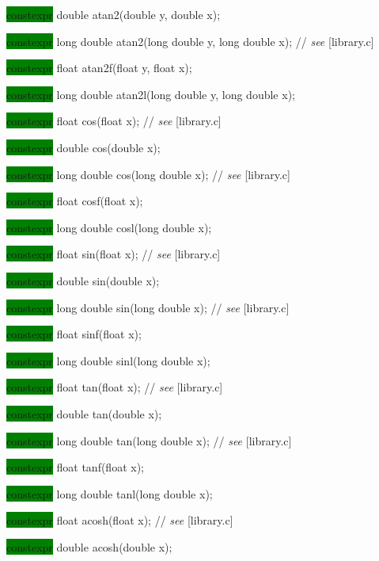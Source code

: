 \documentclass[prd,twocolumn,amsmath,amssymb,nofootinbib,eqsecnum]{revtex4-1}
\newcommand{\highlight}[1]{\colorbox{green}{\!\!\!\! #1}}
\newcommand{\stdcomment}[1]{{// {\it see} [#1]}}
\begin{document}
{\highlight{constexpr} double atan2(double y, double x);

\highlight{constexpr} long double atan2(long double y, long double x); \stdcomment{library.c}

\highlight{constexpr} float atan2f(float y, float x);

\highlight{constexpr} long double atan2l(long double y, long double x);

\vspace{2ex}


\highlight{constexpr} float cos(float x); \stdcomment{library.c}

\highlight{constexpr} double cos(double x);

\highlight{constexpr} long double cos(long double x); \stdcomment{library.c}

\highlight{constexpr} float cosf(float x);

\highlight{constexpr} long double cosl(long double x);

\vspace{2ex}


\highlight{constexpr} float sin(float x); \stdcomment{library.c}

\highlight{constexpr} double sin(double x);

\highlight{constexpr} long double sin(long double x); \stdcomment{library.c}

\highlight{constexpr} float sinf(float x);

\highlight{constexpr} long double sinl(long double x);

\vspace{2ex}


\highlight{constexpr} float tan(float x); \stdcomment{library.c}

\highlight{constexpr} double tan(double x);

\highlight{constexpr} long double tan(long double x); \stdcomment{library.c}

\highlight{constexpr} float tanf(float x);

\highlight{constexpr} long double tanl(long double x);

\vspace{2ex}


\highlight{constexpr} float acosh(float x); \stdcomment{library.c}

\highlight{constexpr} double acosh(double x);

}
\end{document}
